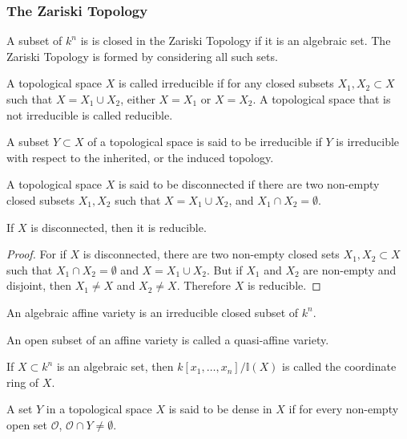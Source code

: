 \documentclass[crop=false,class=book]{standalone}
\begin{document}
\subsubsection{The Zariski Topology}
\begin{definition}
A subset of $k^n$ is is closed in the Zariski Topology if it is an algebraic set. The Zariski Topology is formed by considering all such sets.
\end{definition}
\begin{definition}
A topological space $X$ is called irreducible if for any closed subsets $X_1,X_2\subset X$ such that $X=X_1\cup X_2$, either $X=X_1$ or $X=X_2$. A topological space that is not irreducible is called reducible.
\end{definition}
\begin{definition}
A subset $Y\subset X$ of a topological space is said to be irreducible if $Y$ is irreducible with respect to the inherited, or the induced topology.
\end{definition}
\begin{definition}
A topological space $X$ is said to be disconnected if there are two non-empty closed subsets $X_1,X_2$ such that $X = X_1\cup X_2$, and $X_1\cap X_2 = \emptyset$.
\end{definition}
\begin{theorem}
If $X$ is disconnected, then it is reducible.
\end{theorem}
\begin{proof}
For if $X$ is disconnected, there are two non-empty closed sets $X_1,X_2\subset X$ such that $X_1\cap X_2 = \emptyset$ and $X = X_1\cup X_2$. But if $X_1$ and $X_2$ are non-empty and disjoint, then $X_1\ne X$ and $X_2 \ne X$. Therefore $X$ is reducible.
\end{proof}
\begin{definition}
An algebraic affine variety is an irreducible closed subset of $k^n$.
\end{definition}
\begin{definition}
An open subset of an affine variety is called a quasi-affine variety.
\end{definition}
\begin{definition}
If $X\subset k^n$ is an algebraic set, then $k[x_1,\hdots ,x_n]/\mathbb{I}(X)$ is called the coordinate ring of $X$.
\end{definition}
\begin{definition}
A set $Y$ in a topological space $X$ is said to be dense in $X$ if for every non-empty open set $\mathcal{O}$, $\mathcal{O}\cap Y\ne \emptyset$.
\end{definition}
\end{document}
